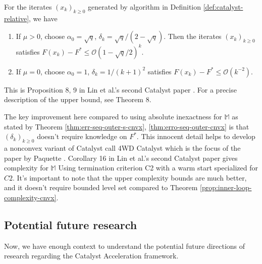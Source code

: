 \documentclass[12pt]{article}
\begin{document}
            \begin{theorem}\label{theorem:catalyst2-outer-loop}
                For the iterates $(x_k)_{k \ge 0}$ generated by algorithm in Definition \ref{def:catalyst-relative}, we have 
                \begin{enumerate}
                    \item If $\mu > 0$, choose $\alpha_0 = \sqrt{q}$, $\delta_k = \sqrt{q}/(2 - \sqrt{q})$. 
                    Then the iterates $(x_k)_{k \ge 0}$ satisfies $F(x_k) - F^* \le \mathcal O\left(1 - \sqrt{q}/2\right)^k$. 
                    \item If $\mu = 0$, choose $\alpha_0 = 1$, $\delta_k = 1/(k + 1)^2$ satisfies $F(x_k) - F^* \le \mathcal O(k^{-2})$. 
                \end{enumerate}
            \end{theorem}
            \begin{remark}
                This is Proposition 8, 9 in Lin et al.'s second Catalyst paper \cite{lin_catalyst_2018}.
                For a precise description of the upper bound, see Theorem 8. 
            \end{remark}
            The key improvement here compared to using absolute inexactness for $\mathbb M$ as stated by Theorem \ref{thm:err-seq-outer-s-cnvx}, \ref{thm:erro-seq-outer-cnvx} is that $(\delta_k)_{k \ge0}$ doesn't require knowledge on $F^*$. 
            This innocent detail helps to develop a nonconvex variant of Catalyst call 4WD Catalyst which is the focus of the paper by Paquette \cite{paquette_catalyst_2018}. 
            Corollary 16 in Lin et al.'s second Catalyst paper \cite{lin_catalyst_2018} gives complexity for $\mathbb M$ Using termination criterion C2 with a warm start specialized for $C2$. 
            It's important to note that the upper complexity bounds are much better, and it doesn't require bounded level set compared to Theorem \ref{prop:inner-loop-complexity-cnvx}.         
    \subsection{Potential future research}\label{ssec:catalyst-future}
        Now, we have enough context to understand the potential future directions of research regarding the Catalyst Acceleration framework. 
\end{document}

